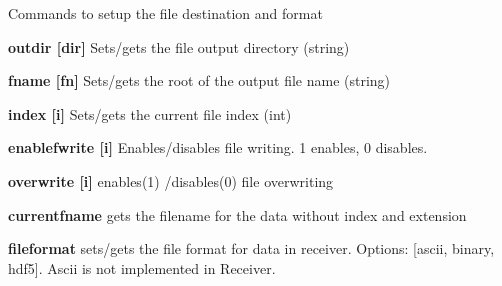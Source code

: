 Commands to setup the file destination and format


\begin{DoxyItemize}
\item {\bfseries outdir \mbox{[}dir\mbox{]}} Sets/gets the file output directory (string)
\end{DoxyItemize}


\begin{DoxyItemize}
\item {\bfseries fname \mbox{[}fn\mbox{]}} Sets/gets the root of the output file name (string)
\end{DoxyItemize}


\begin{DoxyItemize}
\item {\bfseries index \mbox{[}i\mbox{]}} Sets/gets the current file index (int)
\end{DoxyItemize}


\begin{DoxyItemize}
\item {\bfseries enablefwrite \mbox{[}i\mbox{]}} Enables/disables file writing. 1 enables, 0 disables.
\end{DoxyItemize}


\begin{DoxyItemize}
\item {\bfseries overwrite \mbox{[}i\mbox{]}} enables(1) /disables(0) file overwriting
\end{DoxyItemize}


\begin{DoxyItemize}
\item {\bfseries currentfname} gets the filename for the data without index and extension
\end{DoxyItemize}


\begin{DoxyItemize}
\item {\bfseries fileformat} sets/gets the file format for data in receiver. Options: \mbox{[}ascii, binary, hdf5\mbox{]}. Ascii is not implemented in Receiver. 
\end{DoxyItemize}